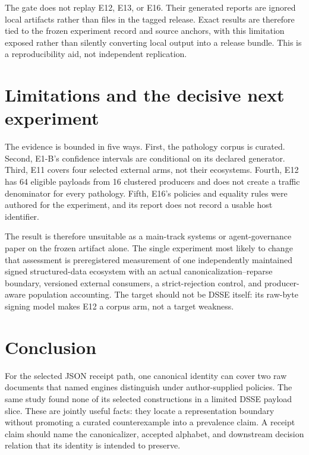 \documentclass[10pt,twocolumn,letterpaper]{article}
\begin{document}
The gate does not replay E12, E13, or E16.  Their generated reports are ignored
local artifacts rather than files in the tagged release.  Exact results are
therefore tied to the frozen experiment record and source anchors, with this
limitation exposed rather than silently converting local output into a release
bundle.  This is a reproducibility aid, not independent replication.

\section{Limitations and the decisive next experiment}
\label{sec:limits}

The evidence is bounded in five ways.  First, the pathology corpus is curated.
Second, E1-B's confidence intervals are conditional on its declared generator.
Third, E11 covers four selected external arms, not their ecosystems.  Fourth,
E12 has 64 eligible payloads from 16 clustered producers and does not create a
traffic denominator for every pathology.  Fifth, E16's policies and equality
rules were authored for the experiment, and its report does not record a
usable host identifier.

The result is therefore unsuitable as a main-track systems or agent-governance
paper on the frozen artifact alone.  The single experiment most likely to
change that assessment is preregistered measurement of one independently
maintained signed structured-data ecosystem with an actual
canonicalization--reparse boundary, versioned external consumers, a
strict-rejection control, and producer-aware population accounting.  The
target should not be DSSE itself: its raw-byte signing model makes E12 a corpus
arm, not a target weakness.

\section{\quad Conclusion}

For the selected JSON receipt path, one canonical identity can cover two raw
documents that named engines distinguish under author-supplied policies.  The
same study found none of its selected constructions in a limited DSSE payload
slice.  These are jointly useful facts: they locate a representation boundary
without promoting a curated counterexample into a prevalence claim.  A receipt
claim should name the canonicalizer, accepted alphabet, and downstream
decision relation that its identity is intended to preserve.

\balance
\begingroup
\small
\setlength{\itemsep}{0pt}


\endgroup
\end{document}
